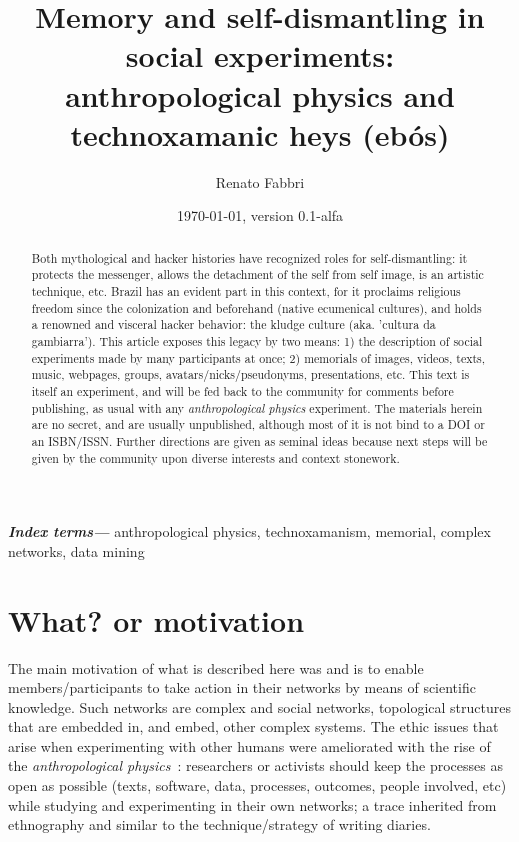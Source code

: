 \documentclass[a4paper]{article}
\title{
Memory and self-dismantling in social experiments:\\
anthropological physics and technoxamanic heys (ebós)
}
\author{Renato Fabbri}
\date{\today, version 0.1-alfa}
\providecommand{\keywords}[1]{\textbf{\textit{Index terms---}} #1}
\begin{document}
\maketitle



\begin{abstract}
Both mythological and hacker histories have recognized roles for
self-dismantling: it protects the messenger, allows the detachment of the self
from self image, is an artistic technique, etc.  Brazil has an evident part
in this context, for it proclaims religious freedom since the colonization and
beforehand (native ecumenical cultures), and holds a renowned and visceral hacker behavior: the kludge
culture (aka. 'cultura da gambiarra').  This article exposes this legacy by two
means: 1) the description of social experiments made by many participants at once;
2) memorials of images, videos, texts, music, webpages, groups,
avatars/nicks/pseudonyms, presentations, etc.  This text is itself an
experiment, and will be fed back to the community for comments before
publishing, as usual with any \emph{anthropological physics} experiment.  The
materials herein are no secret, and are usually unpublished, although most
of it is not bind to a DOI or an ISBN/ISSN.  Further directions are given as
seminal ideas because next steps will be given by the community upon diverse
interests and context stonework.
\end{abstract}

\keywords{
anthropological physics, technoxamanism, memorial, complex networks,
data mining
}

\tableofcontents

\section{What? or motivation}
The main motivation of what is described here was and is to enable
members/participants to take action in their networks by means of scientific
knowledge.  Such networks are complex and social networks, topological
structures that are embedded in, and embed, other complex systems.  The ethic
issues that arise when experimenting with other humans were ameliorated with
the rise of the \emph{anthropological physics}~\cite{anPhy,anPhy2,thesis}:
researchers or activists should keep the processes as open as possible (texts,
software, data, processes, outcomes, people involved, etc) while studying and
experimenting in their own networks; a trace inherited from ethnography and
similar to the technique/strategy of writing diaries.
\end{document}
